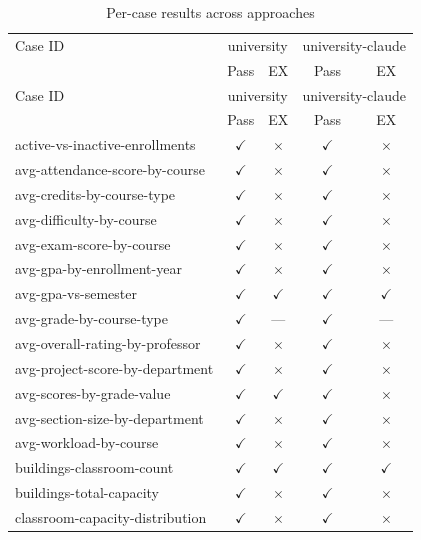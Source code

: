 \begin{longtable}{lcccc}
\caption{Per-case results across approaches}
\label{tab:per-case} \\
\toprule
Case ID & \multicolumn{2}{c}{university} & \multicolumn{2}{c}{university-claude} \\
 & Pass & EX & Pass & EX \\
\midrule
\endfirsthead
\toprule
Case ID & \multicolumn{2}{c}{university} & \multicolumn{2}{c}{university-claude} \\
 & Pass & EX & Pass & EX \\
\midrule
\endhead
\bottomrule
\endfoot
active-vs-inactive-enrollments & $\checkmark$ & $\times$ & $\checkmark$ & $\times$ \\
avg-attendance-score-by-course & $\checkmark$ & $\times$ & $\checkmark$ & $\times$ \\
avg-credits-by-course-type & $\checkmark$ & $\times$ & $\checkmark$ & $\times$ \\
avg-difficulty-by-course & $\checkmark$ & $\times$ & $\checkmark$ & $\times$ \\
avg-exam-score-by-course & $\checkmark$ & $\times$ & $\checkmark$ & $\times$ \\
avg-gpa-by-enrollment-year & $\checkmark$ & $\times$ & $\checkmark$ & $\times$ \\
avg-gpa-vs-semester & $\checkmark$ & $\checkmark$ & $\checkmark$ & $\checkmark$ \\
avg-grade-by-course-type & $\checkmark$ & --- & $\checkmark$ & --- \\
avg-overall-rating-by-professor & $\checkmark$ & $\times$ & $\checkmark$ & $\times$ \\
avg-project-score-by-department & $\checkmark$ & $\times$ & $\checkmark$ & $\times$ \\
avg-scores-by-grade-value & $\checkmark$ & $\checkmark$ & $\checkmark$ & $\times$ \\
avg-section-size-by-department & $\checkmark$ & $\times$ & $\checkmark$ & $\times$ \\
avg-workload-by-course & $\checkmark$ & $\times$ & $\checkmark$ & $\times$ \\
buildings-classroom-count & $\checkmark$ & $\checkmark$ & $\checkmark$ & $\checkmark$ \\
buildings-total-capacity & $\checkmark$ & $\times$ & $\checkmark$ & $\times$ \\
classroom-capacity-distribution & $\checkmark$ & $\times$ & $\checkmark$ & $\times$ \\

\end{longtable}
